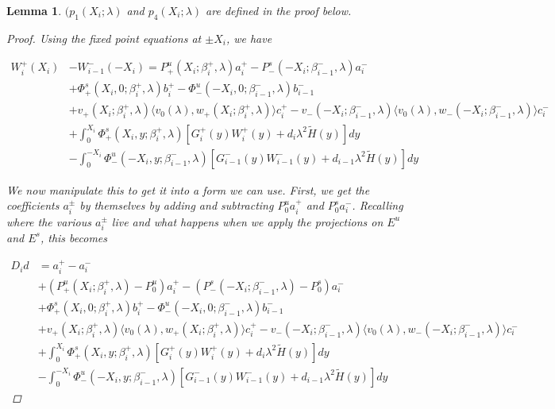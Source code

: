 \documentclass[12pt]{article}
\newtheorem{lemma}{Lemma}
\begin{document}
\begin{lemma}
$(p_1(X_i; \lambda)$ and $p_4(X_i; \lambda)$ are defined in the proof below. 

\begin{proof}

Using the fixed point equations at $\pm X_i$, we have

\begin{align*}
W_i^+(X_i) &- W_{i-1}^-(-X_i) = P^u_+(X_i; \beta_i^+, \lambda) a_i^+ - P^s_-(-X_i; \beta_{i-1}^-, \lambda) a_i^- \\
&+ \Phi^s_+(X_i, 0; \beta_i^+, \lambda)b_i^+ - \Phi^u_-(-X_i, 0; \beta_{i-1}^-, \lambda)b_{i-1}^- \\
&+ v_+(X_i; \beta_i^+, \lambda) \langle v_0(\lambda), w_+(X_i; \beta_i^+, \lambda) \rangle c_i^+ - v_-(-X_i; \beta_{i-1}^-, \lambda) \langle v_0(\lambda), w_-(-X_i; \beta_{i-1}^-, \lambda) \rangle c_i^- \\
&+ \int_0^{X_i} \Phi^s_+(X_i, y; \beta_i^+, \lambda) [ G_i^+(y) W_i^+(y) + d_i \lambda^2 \tilde{H}(y) ] dy \\
&- \int_0^{-X_i} \Phi^u_-(-X_i, y; \beta_{i-1}^-, \lambda) [ G_{i-1}^-(y) W_{i-1}^-(y) + d_{i-1} \lambda^2 \tilde{H}(y) ] dy
\end{align*}

We now manipulate this to get it into a form we can use. First, we get the coefficients $a_i^\pm$ by themselves by adding and subtracting $P_0^u a_i^+$ and $P_0^s a_i^-$. Recalling where the various $a_i^\pm$ live and what happens when we apply the projections on $E^u$ and $E^s$, this becomes

\begin{align*}
D_i d &= a_i^+ - a_i^- \\
&+ (P^u_+(X_i; \beta_i^+, \lambda) - P_0^u)a_i^+ - (P^s_-(-X_i; \beta_{i-1}^-, \lambda) - P_0^s)a_i^- \\
&+ \Phi^s_+(X_i, 0; \beta_i^+, \lambda)b_i^+ - \Phi^u_-(-X_i, 0; \beta_{i-1}^-, \lambda)b_{i-1}^- \\
&+ v_+(X_i; \beta_i^+, \lambda) \langle v_0(\lambda), w_+(X_i; \beta_i^+, \lambda) \rangle c_i^+ - v_-(-X_i; \beta_{i-1}^-, \lambda) \langle v_0(\lambda), w_-(-X_i; \beta_{i-1}^-, \lambda) \rangle c_i^- \\
&+ \int_0^{X_i} \Phi^s_+(X_i, y; \beta_i^+, \lambda) [ G_i^+(y) W_i^+(y) + d_i \lambda^2 \tilde{H}(y) ] dy \\
&- \int_0^{-X_i} \Phi^u_-(-X_i, y; \beta_{i-1}^-, \lambda) [ G_{i-1}^-(y) W_{i-1}^-(y) + d_{i-1} \lambda^2 \tilde{H}(y) ] dy
\end{align*}


\end{proof}
\end{lemma}
\end{document}
